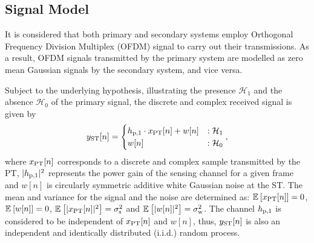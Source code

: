 

\subsection{Signal Model}
It is considered that both primary and secondary systems employ Orthogonal Frequency Division Multiplex (OFDM) signal to carry out their transmissions. As a result, OFDM signals transmitted by the primary system are modelled as zero mean Gaussian signals by the secondary system, and vice versa. 

Subject to the underlying hypothesis, illustrating the presence $\mathcal H_1$ and the absence $\mathcal H_0$ of the primary signal, the discrete and complex received signal is given by 
\begin{equation}
y_{\text{ST}}[n] = 
\begin{cases}
h_{\text{p,1}} \cdot x_{\text{PT}}[n] + w[n] & : \mathcal{H}_1 \\
w[n] & :\mathcal{H}_0
\end{cases},
\label{eq:sig_mod_st}
\end{equation}
where $x_{\text{PT}}[n]$ corresponds to a discrete and complex sample transmitted by the PT, $|h_{\text{p,1}}|^2$ represents the power gain of the sensing channel for a given frame and $w[n]$ is circularly symmetric additive white Gaussian noise at the ST. 
The mean and variance for the signal and the noise are determined as: ${\mathbb E}_{}\left[ x_{\text{PT}}[n] \right] = 0$, ${\mathbb E}_{}\left[ w[n] \right] = 0$, ${\mathbb E}_{}\left[ |x_{\text{PT}}[n]|^2 \right] = \sigma^2_{\text{s}}$ and ${\mathbb E}_{}\left[ |w[n]|^2 \right] = \sigma^2_{\text{w}}$. 
The channel $h_{\text{p,1}}$ is considered to be independent of $x_{\text{PT}}[n]$ and $w[n]$, thus, $y_{\text{ST}}[n]$ is also an independent and identically distributed (i.i.d.) random process.

